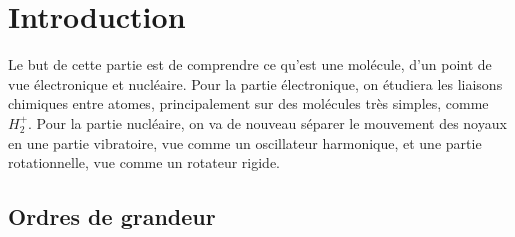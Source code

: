 
 
 \section{Introduction}
 
 Le but de cette partie est de comprendre ce qu'est une molécule, d'un point de vue électronique et nucléaire. Pour la partie électronique, on étudiera les liaisons chimiques entre atomes, principalement sur des molécules très simples, comme $H^+_2$. Pour la partie nucléaire, on va de nouveau séparer le mouvement des noyaux en une partie vibratoire, vue comme un oscillateur harmonique, et une partie rotationnelle, vue comme un rotateur rigide.
 
 \subsection{Ordres de grandeur}
 
